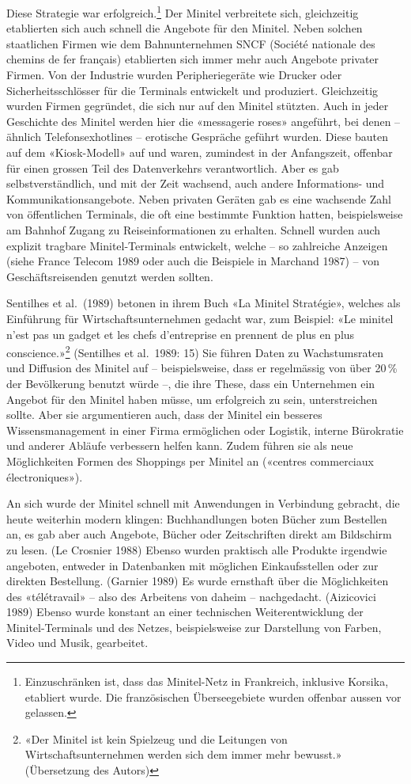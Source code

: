 \documentclass[a4paper,
fontsize=11pt,
oneside,
numbers=noperiodatend,
parskip=half-,
bibliography=totoc,
final
]{scrartcl}
\begin{document}
Diese Strategie war erfolgreich.\footnote{Einzuschränken ist, dass das
  Minitel-Netz in Frankreich, inklusive Korsika, etabliert wurde. Die
  französischen Überseegebiete wurden offenbar aussen vor gelassen.} Der
Minitel verbreitete sich, gleichzeitig etablierten sich auch schnell die
Angebote für den Minitel. Neben solchen staatlichen Firmen wie dem
Bahnunternehmen SNCF (Société nationale des chemins de fer français)
etablierten sich immer mehr auch Angebote privater Firmen. Von der
Industrie wurden Peripheriegeräte wie Drucker oder Sicherheitsschlösser
für die Terminals entwickelt und produziert. Gleichzeitig wurden Firmen
gegründet, die sich nur auf den Minitel stützten. Auch in jeder
Geschichte des Minitel werden hier die «messagerie roses» angeführt, bei
denen -- ähnlich Telefonsexhotlines -- erotische Gespräche geführt
wurden. Diese bauten auf dem «Kiosk-Modell» auf und waren, zumindest in
der Anfangszeit, offenbar für einen grossen Teil des Datenverkehrs
verantwortlich. Aber es gab selbstverständlich, und mit der Zeit
wachsend, auch andere Informations- und Kommunikationsangebote. Neben
privaten Geräten gab es eine wachsende Zahl von öffentlichen Terminals,
die oft eine bestimmte Funktion hatten, beispielsweise am Bahnhof Zugang
zu Reiseinformationen zu erhalten. Schnell wurden auch explizit tragbare
Minitel-Terminals entwickelt, welche -- so zahlreiche Anzeigen (siehe
France Telecom 1989 oder auch die Beispiele in Marchand 1987) -- von
Geschäftsreisenden genutzt werden sollten.

Sentilhes et al.~(1989) betonen in ihrem Buch «La Minitel Stratégie»,
welches als Einführung für Wirtschaftsunternehmen gedacht war, zum
Beispiel: «Le minitel n'est pas un gadget et les chefs d'entreprise en
prennent de plus en plus conscience.»\footnote{«Der Minitel ist kein
  Spielzeug und die Leitungen von Wirtschaftsunternehmen werden sich dem
  immer mehr bewusst.» (Übersetzung des Autors)} (Sentilhes et al.~1989:
15) Sie führen Daten zu Wachstumsraten und Diffusion des Minitel auf --
beispielsweise, dass er regelmässig von über 20\,\% der Bevölkerung
benutzt würde --, die ihre These, dass ein Unternehmen ein Angebot für
den Minitel haben müsse, um erfolgreich zu sein, unterstreichen sollte.
Aber sie argumentieren auch, dass der Minitel ein besseres
Wissensmanagement in einer Firma ermöglichen oder Logistik, interne
Bürokratie und anderer Abläufe verbessern helfen kann. Zudem führen sie
als neue Möglichkeiten Formen des Shoppings per Minitel an («centres
commerciaux électroniques»).

An sich wurde der Minitel schnell mit Anwendungen in Verbindung
gebracht, die heute weiterhin modern klingen: Buchhandlungen boten
Bücher zum Bestellen an, es gab aber auch Angebote, Bücher oder
Zeitschriften direkt am Bildschirm zu lesen. (Le Crosnier 1988) Ebenso
wurden praktisch alle Produkte irgendwie angeboten, entweder in
Datenbanken mit möglichen Einkaufsstellen oder zur direkten Bestellung.
(Garnier 1989) Es wurde ernsthaft über die Möglichkeiten des
«télétravail» -- also des Arbeitens von daheim -- nachgedacht.
(Aizicovici 1989) Ebenso wurde konstant an einer technischen
Weiterentwicklung der Minitel-Terminals und des Netzes, beispielsweise
zur Darstellung von Farben, Video und Musik, gearbeitet.
\end{document}

